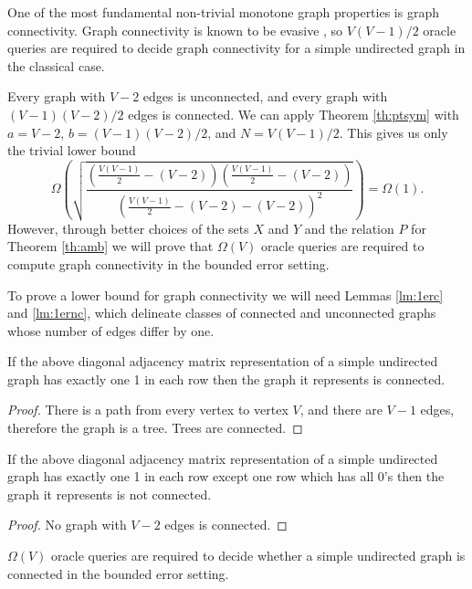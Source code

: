 One of the most fundamental non-trivial monotone graph properties is
graph connectivity.  Graph connectivity is known to be evasive
\cite{felsner92complexity}, so $V(V-1)/2$ oracle queries are 
required to decide graph connectivity for a simple undirected graph in
the classical case.

Every graph with $V-2$ edges is unconnected, and every graph with
$(V-1)(V-2)/2$ edges is connected.  We can apply Theorem
\ref{th:ptsym} with $a = V-2$, $b = (V-1)(V-2)/2$, and $N =
V(V-1)/2$.  This gives us only the trivial lower bound
\[\Omega\left(\sqrt{\frac {\left(\frac{V(V-1)}{2} -
(V-2)\right)\left(\frac{V(V-1)}{2} - (V-2)\right) }
{\left(\frac{V(V-1)}{2} - (V-2) - (V-2)\right)^{2}}}
\right) = \Omega(1).\] 
However, through better choices of the sets $X$ and $Y$ and the
relation $P$ for Theorem \ref{th:amb} we will prove that $\Omega(V)$
oracle queries are required to compute graph connectivity in the
bounded error setting.

To prove a lower bound for graph connectivity we will need Lemmas
\ref{lm:1erc} and \ref{lm:1ernc}, which delineate classes of connected 
and unconnected graphs whose number of edges differ by one.

\begin{lemma}
\label{lm:1erc}
If the above diagonal adjacency matrix representation of a simple
undirected graph has exactly one 1 in each row then the graph it
represents is connected.
\end{lemma}

\begin{proof}
There is a path from every vertex to vertex $V$, and there are $V-1$
edges, therefore the graph is a tree.  Trees are connected.
\end{proof}

\begin{lemma}
\label{lm:1ernc}
If the above diagonal adjacency matrix representation of a simple
undirected graph has exactly one 1 in each row except one row which
has all 0's then the graph it represents is not connected.
\end{lemma}

\begin{proof}
No graph with $V-2$ edges is connected.
\end{proof}

\begin{theorem}
\label{th:gc}
$\Omega(V)$ oracle queries are required to decide whether a simple
undirected graph is connected in the bounded error setting.
\end{theorem}

